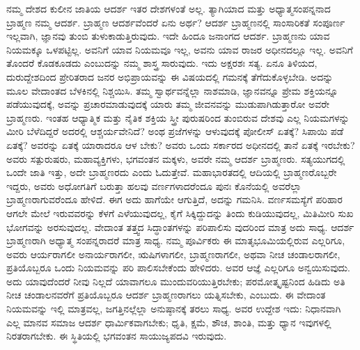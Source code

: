 ನಮ್ಮ ದೇಶದ ಕುಲೀನ ಜಾತಿಯ ಆದರ್ಶ ಇತರ ದೇಶಗಳಂತೆ ಅಲ್ಲ. ತ್ಯಾಗಿಯಾದ ಮತ್ತು ಅಧ್ಯಾತ್ಮಸಂಪನ್ನನಾದ ಬ್ರಾಹ್ಮಣ ನಮ್ಮ ಆದರ್ಶ. ಬ್ರಾಹ್ಮಣ ಆದರ್ಶವೆಂದರೆ ಏನು ಅರ್ಥ? ಆದರ್ಶ ಬ್ರಾಹ್ಮಣನಲ್ಲಿ ಸಾಂಸಾರಿಕತೆ ಸಂಪೂರ್ಣ ಇಲ್ಲವಾಗಿ, ಜ್ಞಾನವು ತುಂಬಿ ತುಳುಕಾಡುತ್ತಿರುವುದು. ಇದೇ ಹಿಂದೂ ಜನಾಂಗದ ಆದರ್ಶ. ಬ್ರಾಹ್ಮಣನು ಯಾವ ನಿಯಮಕ್ಕೂ ಒಳಪಟ್ಟಿಲ್ಲ. ಅವನಿಗೆ ಯಾವ ನಿಯಮವೂ ಇಲ್ಲ, ಅವನು ಯಾವ ರಾಜರ ಅಧೀನದಲ್ಲೂ ಇಲ್ಲ. ಅವನಿಗೆ ತೊಂದರೆ ಕೊಡಕೂಡದು ಎಂಬುದನ್ನು ನಮ್ಮ ಶಾಸ್ತ್ರ ಸಾರುವುದು. ಇದು ಅಕ್ಷರಶಃ ಸತ್ಯ. ಏನೂ ತಿಳಿಯದ, ದುರುದ್ದೇಶದಿಂದ ಪ್ರೇರಿತರಾದ ಜನರ ಅಭಿಪ್ರಾಯವನ್ನು ಈ ವಿಷಯದಲ್ಲಿ ಗಮನಕ್ಕೆ ತೆಗೆದುಕೊಳ್ಳಬೇಡಿ. ಅದನ್ನು ಮೂಲ ವೇದಾಂತದ ಬೆಳಕಿನಲ್ಲಿ ನಿಶ್ಚಯಿಸಿ. ತಮ್ಮ ಸ್ವಾರ್ಥವನ್ನೆಲ್ಲಾ ನಾಶಮಾಡಿ, ಜ್ಞಾನವನ್ನೂ ಪ್ರೇಮ ಶಕ್ತಿಯನ್ನೂ ಪಡೆಯುವುದಕ್ಕೆ, ಅವನ್ನು ಪ್ರಚಾರಮಾಡುವುದಕ್ಕೆ ಯಾರು ತಮ್ಮ ಜೀವನವನ್ನು ಮುಡುಪಾಗಿಡುತ್ತಾರೋ ಅವರೇ ಬ್ರಾಹ್ಮಣರು. ಇಂತಹ ಆಧ್ಯಾತ್ಮಿಕ ಮತ್ತು ನೈತಿಕ ಶಕ್ತಿಯ ಸ್ತ್ರೀ ಪುರುಷರಿಂದ ತುಂಬಿರುವ ದೇಶವು ಎಲ್ಲ ನಿಯಮಗಳನ್ನು ಮೀರಿ ಬೆಳೆದಿದ್ದರೆ ಅದರಲ್ಲಿ ಆಶ್ಚರ್ಯವೇನಿದೆ? ಅಂಥ ಪ್ರಜೆಗಳನ್ನು ಆಳುವುದಕ್ಕೆ ಪೋಲೀಸ್​ ಏತಕ್ಕೆ? ಸಿಪಾಯಿ ಪಡೆ ಏತಕ್ಕೆ? ಅವರನ್ನು ಏತಕ್ಕೆ ಯಾರಾದರೂ ಆಳ ಬೇಕು? ಅವರು ಒಂದು ಸರ್ಕಾರದ ಅಧೀನದಲ್ಲಿ ತಾನೆ ಏತಕ್ಕೆ ಇರಬೇಕು? ಅವರು ಸತ್ಪುರುಷರು, ಮಹಾವ್ಯಕ್ತಿಗಳು, ಭಗವಂತನ ಮಕ್ಕಳು, ಅವರೇ ನಮ್ಮ ಆದರ್ಶ ಬ್ರಾಹ್ಮಣರು. ಸತ್ಯಯುಗದಲ್ಲಿ ಒಂದೇ ಜಾತಿ ಇತ್ತು, ಅದೇ ಬ್ರಾಹ್ಮಣರದು ಎಂದು ಓದುತ್ತೇವೆ. ಮಹಾಭಾರತದಲ್ಲಿ ಆದಿಯಲ್ಲಿ ಬ್ರಾಹ್ಮಣರೊಬ್ಬರೇ ಇದ್ದರು, ಅವರು ಅಧೋಗತಿಗೆ ಬರುತ್ತಾ ಹಲವು ವರ್ಣಗಳಾದರೆಂದೂ ಪುನಃ ಕೊನೆಯಲ್ಲಿ ಅವರೆಲ್ಲಾ ಬ್ರಾಹ್ಮಣರಾಗುವರೆಂದೂ ಹೇಳಿದೆ. ಈಗ ಅದು ಹಾಗೆಯೇ ಆಗುತ್ತಿದೆ, ಅದನ್ನು ಗಮನಿಸಿ. ವರ್ಣಸಮಸ್ಯೆಗೆ ಪರಿಹಾರ ಆಗಲೇ ಮೇಲೆ ಇರುವವರನ್ನು ಕೆಳಗೆ ಎಳೆಯುವುದಲ್ಲ, ಕೈಗೆ ಸಿಕ್ಕಿದ್ದುದನ್ನು ತಿಂದು ಕುಡಿಯುವುದಲ್ಲ, ಮಿತಿಮೀರಿ ಸುಖ ಭೋಗವನ್ನು ಅರಸುವುದಲ್ಲ. ವೇದಾಂತ ತತ್ತ್ವದ ಸಿದ್ಧಾಂತಗಳನ್ನು ಪರಿಪಾಲಿಸು ವುದರಿಂದ ಮಾತ್ರ ಅದು ಸಾಧ್ಯ. ಆದರ್ಶ ಬ್ರಾಹ್ಮಣರಾಗಿ ಅಧ್ಯಾತ್ಮ ಸಂಪನ್ನರಾದರೆ ಮಾತ್ರ ಸಾಧ್ಯ. ನಮ್ಮ ಪೂರ್ವಿಕರು ಈ ಮಾತೃಭೂಮಿಯಲ್ಲಿರುವ ಎಲ್ಲರಿಗೂ, ಅವರು ಆರ್ಯರಾಗಲೀ ಅನಾರ್ಯರಾಗಲೀ, ಋಷಿಗಳಾಗಲೀ, ಬ್ರಾಹ್ಮಣರಾಗಲೀ, ಅಥವಾ ನೀಚ ಚಂಡಾಲರಾಗಲೀ, ಪ್ರತಿಯೊಬ್ಬರೂ ಒಂದು ನಿಯಮವನ್ನು ಪರಿ ಪಾಲಿಸಬೇಕೆಂದು ಹೇಳಿದರು. ಅವರ ಆಜ್ಞೆ ಎಲ್ಲರಿಗೂ ಅನ್ವಯಿಸುವುದು. ಅದು ಯಾವುದೆಂದರೆ ನೀವು ನಿಲ್ಲದೆ ಯಾವಾಗಲೂ ಮುಂದುವರಿಯುತ್ತಿರಬೇಕು; ಪರಮೋತ್ಕೃಷ್ಟನಿಂದ ಹಿಡಿದು ಅತಿ ನೀಚ ಚಂಡಾಲನವರೆಗೆ ಪ್ರತಿಯೊಬ್ಬರೂ ಆದರ್ಶ ಬ್ರಾಹ್ಮಣರಾಗಲು ಯತ್ನಿಸಬೇಕು, ಎಂಬುದು. ಈ ವೇದಾಂತ ನಿಯಮವನ್ನು ಇಲ್ಲಿ ಮಾತ್ರವಲ್ಲ, ಜಗತ್ತಿನಲ್ಲೆಲ್ಲಾ ಅನುಷ್ಠಾನಕ್ಕೆ ತರಲು ಸಾಧ್ಯ. ಅವರ ಉದ್ದೇಶ ಇದು: ನಿಧಾನವಾಗಿ ಎಲ್ಲ ಮಾನವ ಸಮಾಜ ಆದರ್ಶ ಧಾರ್ಮಿಕವಾಗಬೇಕು; ಧೃತಿ, ಕ್ಷಮೆ, ಶೌಚ, ಶಾಂತಿ, ಮತ್ತು ಧ್ಯಾನ ಇವುಗಳಲ್ಲಿ ನಿರತರಾಗಬೇಕು. ಈ ಸ್ಥಿತಿಯಲ್ಲಿ ಭಗವಂತನ ಸಾಯುಜ್ಯಪದವಿ ಇರುವುದು.


